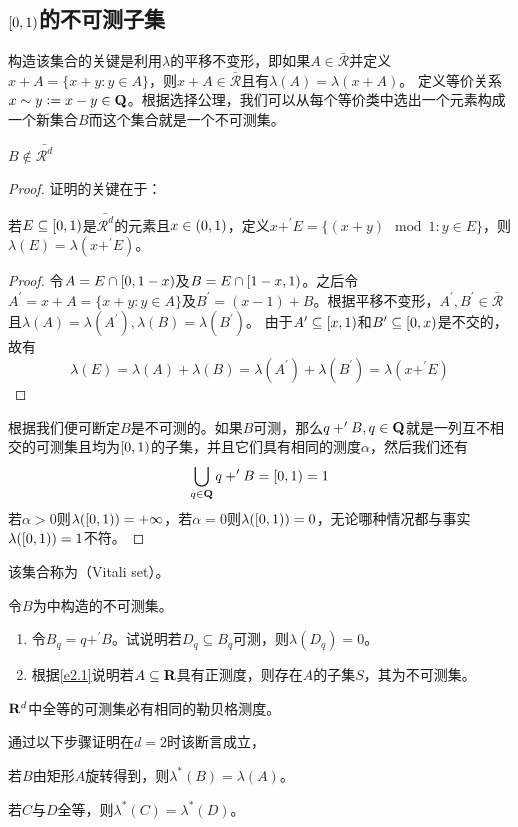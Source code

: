 \documentclass[main.tex]{subfiles}
\begin{document}
\subsection*{\(\intco{0,1}\)的不可测子集}
构造该集合的关键是利用\(\lambda\)的平移不变形，即如果\(A \in \bar{\mathcal{R}}\)并定义\(x+A = \{x+y: y\in A\}\)，则\(x+A\in \bar{\mathcal{R}}\)且有\(\lambda(A)=\lambda(x+A)\)。
定义等价关系\(x\sim y := x-y \in \mathbf{Q}\)。根据选择公理，我们可以从每个等价类中选出一个元素构成一个新集合\(B\)而这个集合就是一个不可测集。
\begin{theorem} \label{thm:a.2.4}
	\(B \notin \bar{\mathcal{R}^d}\)
\end{theorem}
\begin{proof}
	证明的关键在于：
	\begin{lemma}\label{lem:a.2.5}
		若\(E \subseteq \intco{0,1}\)是\(\bar{\mathcal{R}^d}\)的元素且\(x \in \intoo{0,1}\)，定义\(x+^\prime E = \{(x+y) \mod 1:y\in E\}\)，则\(\lambda(E) = \lambda(x+^\prime E)\)。
	\end{lemma}
	\begin{proof}
		令\(A = E\cap \intco{0,1-x}\)及\(B = E\cap\intco{1-x,1}\)。之后令\(A^\prime = x+A = \{x+y: y\in A\}\)及\(B^\prime = (x-1)+B\)。根据平移不变形，\(A^\prime,B^\prime \in \bar{\mathcal{R}}\)且\(\lambda(A) = \lambda(A^\prime), \lambda(B) = \lambda(B^\prime)\)。
		由于\(A^\prime \subseteq \intco{x,1}\)和\(B^\prime \subseteq \intco{0,x}\)是不交的，故有
		\[\lambda(E) = \lambda(A)+\lambda(B) = \lambda(A^\prime)+\lambda(B^\prime) = \lambda(x+^\prime E)\]
	\end{proof}
	根据我们便可断定\(B\)是不可测的。如果\(B\)可测，那么\(q+^\prime B, q \in \mathbf{Q}\)就是一列互不相交的可测集且均为\(\intco{0,1}\)的子集，并且它们具有相同的测度\(\alpha\)，然后我们还有
	\[\bigcup_{q\in\Q}q+^\prime B = \intco{0,1}=1\]
	若\(\alpha > 0\)则\(\lambda(\intco{0,1})=+\infty\)，若\(\alpha=0\)则\(\lambda(\intco{0,1})=0\)，无论哪种情况都与事实\(\lambda(\intco{0,1})=1\)不符。
\end{proof}
该集合称为（Vitali set）。
\begin{exercise}
	\item 令\(B\)为中构造的不可测集。
	\begin{enumerate}
		\item\label{e2.1} 令\(B_q=q+^\prime B\)。试说明若\(D_q \subseteq B_q\)可测，则\(\lambda(D_q) = 0\)。
		\item 根据\ref{e2.1}说明若\(A\subseteq \mathbf{R}\)具有正测度，则存在\(A\)的子集\(S\)，其为不可测集。
	\end{enumerate}
	\begin{claim}
		\(\mathbf{R}^d\)中全等的可测集必有相同的勒贝格测度。
	\end{claim}
	\item 通过以下步骤证明在\(d=2\)时该断言成立，
	\begin{exercise}
		\item 若\(B\)由矩形\(A\)旋转得到，则\(\lambda^*(B)=\lambda(A)\)。
		\item 若\(C\)与\(D\)全等，则\(\lambda^*(C)=\lambda^*(D)\)。
	\end{exercise}
\end{exercise}
\end{document}
